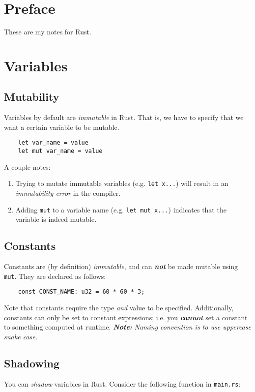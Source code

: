 \documentclass{report}
\newcommand{\textib}[1]{\textit{\textbf{{#1}}}}
\newcommand{\code}[1]{\texttt{{#1}}}
\newcommand{\note}[1]{\textib{Note:} \textit{{#1}}}
\begin{document}
\tableofcontents
\newpage
\chapter{Preface}
These are my notes for Rust. 

\chapter{Variables}
\section{Mutability}
Variables by default are \textit{immutable} in Rust. That is, we have to specify that we want a 
certain variable to be mutable.
\begin{lstlisting}
    let var_name = value
    let mut var_name = value
\end{lstlisting}
A couple notes:

\begin{enumerate}[label=\textit{(\roman*)}]
    \item Trying to mutate immutable variables (e.g. \code{let x...}) will result in an
        \textit{immutability error} in the compiler.
    \item Adding \code{mut} to a variable name (e.g. \code{let mut x...}) indicates that
        the variable is indeed mutable.
\end{enumerate}

\section{Constants}
Constants are (by definition) \textit{immutable}, and can \textib{not} be made mutable using 
\code{mut}. They are declared as follows:
\begin{lstlisting}
    const CONST_NAME: u32 = 60 * 60 * 3;
\end{lstlisting}
Note that constants require the type \textit{and} value to be specified. Additionally, constants
can only be set to constant expressions; i.e. you \textib{cannot} set a constant to something 
computed at runtime.
\newline
\newline
\note{Naming convention is to use uppercase snake case.}


\section{Shadowing}
You can \textit{shadow} variables in Rust. Consider the following function in \code{main.rs}:
\end{document}
